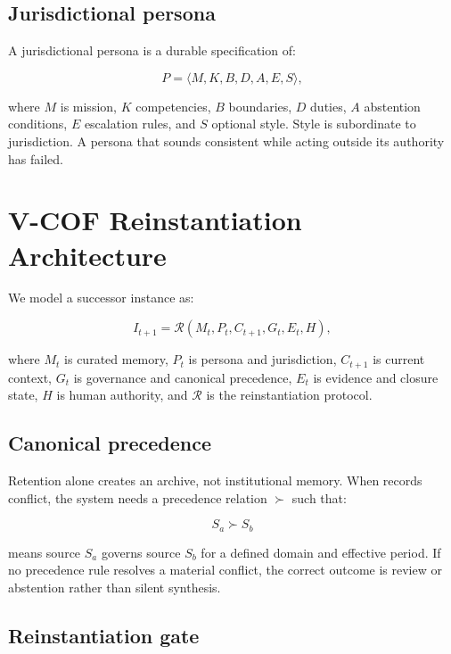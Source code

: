 \documentclass[10pt]{article}
\begin{document}
\subsection{Jurisdictional persona}

A jurisdictional persona is a durable specification of:

\begin{equation}
P = \langle M, K, B, D, A, E, S \rangle,
\end{equation}

where $M$ is mission, $K$ competencies, $B$ boundaries, $D$ duties, $A$ abstention conditions, $E$ escalation rules, and $S$ optional style. Style is subordinate to jurisdiction. A persona that sounds consistent while acting outside its authority has failed.

\section{V-COF Reinstantiation Architecture}

We model a successor instance as:

\begin{equation}
I_{t+1} = \mathcal{R}(M_t, P_t, C_{t+1}, G_t, E_t, H),
\end{equation}

where $M_t$ is curated memory, $P_t$ is persona and jurisdiction, $C_{t+1}$ is current context, $G_t$ is governance and canonical precedence, $E_t$ is evidence and closure state, $H$ is human authority, and $\mathcal{R}$ is the reinstantiation protocol.

\subsection{Canonical precedence}

Retention alone creates an archive, not institutional memory. When records conflict, the system needs a precedence relation $\succ$ such that:

\begin{equation}
S_a \succ S_b
\end{equation}

means source $S_a$ governs source $S_b$ for a defined domain and effective period. If no precedence rule resolves a material conflict, the correct outcome is review or abstention rather than silent synthesis.

\subsection{Reinstantiation gate}
\end{document}
